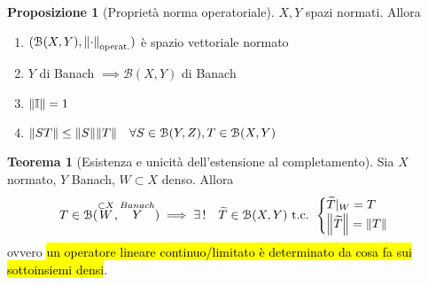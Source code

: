 \documentclass[a4paper,10pt]{article}
\theoremstyle{definition}
\theoremstyle{indentdefinition}
\theoremstyle{indenttheorem}
\newtheorem{thm}{Teorema}
\newtheorem{prop}{Proposizione}
\theoremstyle{myremark}
\theoremstyle{indentgeneral}
\newenvironment{myboxed} 
{\noindent\begin{lrbox}{\mybox}\begin{minipage}{\textwidth}}
{\end{minipage}\end{lrbox}\fbox{\usebox{\mybox}}}
\begin{document}
\begin{prop}[Proprietà norma operatoriale]
    $X,Y$ spazi normati. Allora
    \begin{enumerate}
        \item $(\mathcal{B}(X,Y),\norm{\cdot}_{\text{operat.}})$ è spazio vettoriale normato
        \item $Y$ di Banach $\implies \mathcal{B}(X,Y)$ di Banach
        \item $\norm{\mathbb{I}}=1$
        \item $\norm{ST}\le \norm{S}\norm{T}\quad \forall S\in \mathcal{B}(Y,Z),T\in\mathcal{B}(X,Y)$
    \end{enumerate}
\end{prop}

\begin{myboxed}
\begin{thm}[Esistenza e unicità dell'estensione al completamento]\label{thm-esistenza-unicità-estensione-operatori}
    Sia $X$ normato, $Y$ Banach, $W\subset X$ denso. Allora
    $$T\in \mathcal{B}(\overset{\subset X}{W},\overset{Banach}{Y})\implies \exists\,!\quad\widetilde{T}\in \mathcal{B}(X,Y)\text{ t.c. } \begin{cases}
        \widetilde{T}|_W=T\\
        \norm{\widetilde{T}}=\norm{T}
    \end{cases}$$
    ovvero \hl{un operatore lineare continuo/limitato è determinato da cosa fa sui sottoinsiemi densi}.
\end{thm}
\end{myboxed}
\end{document}
